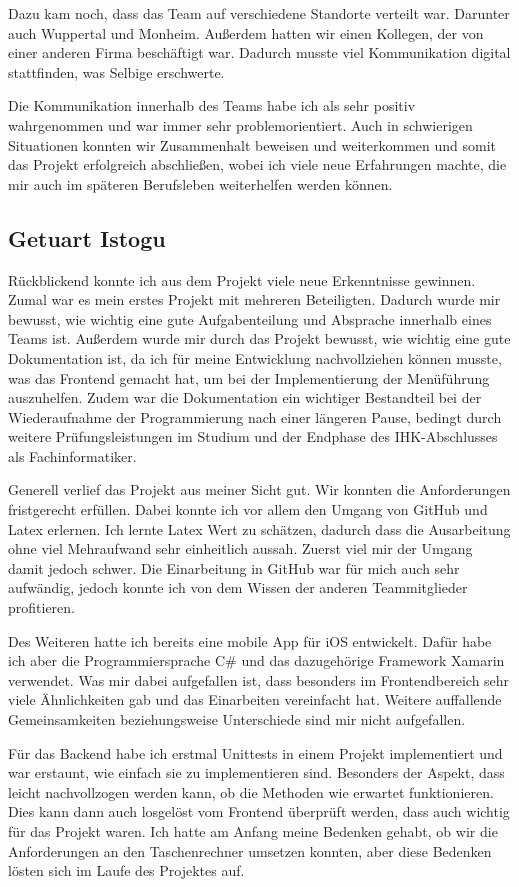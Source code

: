 Dazu kam noch, dass das Team auf verschiedene Standorte verteilt war. Darunter auch Wuppertal und Monheim. Außerdem hatten wir einen Kollegen, der von einer anderen Firma beschäftigt war. Dadurch musste viel Kommunikation digital stattfinden, was Selbige erschwerte. 

Die Kommunikation innerhalb des Teams habe ich als sehr positiv wahrgenommen und war immer sehr problemorientiert. Auch in schwierigen Situationen konnten wir Zusammenhalt beweisen und weiterkommen und somit das Projekt erfolgreich abschließen, wobei ich viele neue Erfahrungen machte, die mir auch im späteren Berufsleben weiterhelfen werden können.

\subsection{Getuart Istogu}
Rückblickend konnte ich aus dem Projekt viele neue Erkenntnisse gewinnen. Zumal war es mein erstes Projekt mit mehreren Beteiligten. Dadurch wurde mir bewusst, wie wichtig eine gute Aufgabenteilung und Absprache innerhalb eines Teams ist. Außerdem wurde mir durch das Projekt bewusst, wie wichtig eine gute Dokumentation ist, da ich für meine Entwicklung nachvollziehen können musste, was das Frontend gemacht hat, um bei der Implementierung der Menüführung auszuhelfen. Zudem war die Dokumentation ein wichtiger Bestandteil bei der Wiederaufnahme der Programmierung nach einer längeren Pause, bedingt durch weitere Prüfungsleistungen im Studium und der Endphase des IHK-Abschlusses als Fachinformatiker.

Generell verlief das Projekt aus meiner Sicht gut. Wir konnten die Anforderungen fristgerecht erfüllen. Dabei konnte ich vor allem den Umgang von GitHub und Latex erlernen. Ich lernte Latex Wert zu schätzen, dadurch dass die Ausarbeitung ohne viel Mehraufwand sehr einheitlich aussah. Zuerst viel mir der Umgang damit jedoch schwer. Die Einarbeitung in GitHub war für mich auch sehr aufwändig, jedoch konnte ich von dem Wissen der anderen Teammitglieder profitieren. 

Des Weiteren hatte ich bereits eine mobile App für iOS entwickelt. Dafür habe ich aber die Programmiersprache C\# und das dazugehörige Framework Xamarin verwendet. Was mir dabei aufgefallen ist, dass besonders im Frontendbereich sehr viele Ähnlichkeiten gab und das Einarbeiten vereinfacht hat. Weitere auffallende Gemeinsamkeiten beziehungsweise Unterschiede sind mir nicht aufgefallen. 

Für das Backend habe ich erstmal Unittests in einem Projekt implementiert und war erstaunt, wie einfach sie zu implementieren sind. Besonders der Aspekt, dass leicht nachvollzogen werden kann, ob die Methoden wie erwartet funktionieren. Dies kann dann auch losgelöst vom Frontend überprüft werden, dass auch wichtig für das Projekt waren.
Ich hatte am Anfang meine Bedenken gehabt, ob wir die Anforderungen an den Taschenrechner umsetzen konnten, aber diese Bedenken lösten sich im Laufe des Projektes auf.


